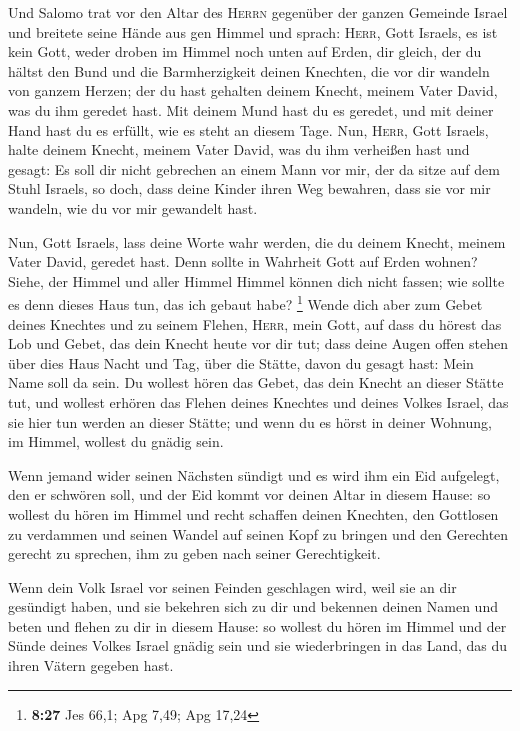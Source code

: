  Und Salomo trat vor den Altar des \textsc{Herrn}
gegenüber der ganzen Gemeinde Israel und breitete seine Hände aus gen
Himmel  und sprach: \textsc{Herr}, Gott Israels, es ist
kein Gott, weder droben im Himmel noch unten auf Erden, dir gleich, der
du hältst den Bund und die Barmherzigkeit deinen Knechten, die vor dir
wandeln von ganzem Herzen;  der du hast gehalten deinem
Knecht, meinem Vater David, was du ihm geredet hast. Mit deinem Mund
hast du es geredet, und mit deiner Hand hast du es erfüllt, wie es steht
an diesem Tage.  Nun, \textsc{Herr}, Gott Israels, halte
deinem Knecht, meinem Vater David, was du ihm verheißen hast und gesagt:
Es soll dir nicht gebrechen an einem Mann vor mir, der da sitze auf dem
Stuhl Israels, so doch, dass deine Kinder ihren Weg bewahren, dass sie
vor mir wandeln, wie du vor mir gewandelt hast.

 Nun, Gott Israels, lass deine Worte wahr werden, die du
deinem Knecht, meinem Vater David, geredet hast.  Denn
sollte in Wahrheit Gott auf Erden wohnen? Siehe, der Himmel und aller
Himmel Himmel können dich nicht fassen; wie sollte es denn dieses Haus
tun, das ich gebaut habe? \footnote{\textbf{8:27} Jes 66,1; Apg 7,49;
  Apg 17,24}  Wende dich aber zum Gebet deines Knechtes
und zu seinem Flehen, \textsc{Herr}, mein Gott, auf dass du hörest das
Lob und Gebet, das dein Knecht heute vor dir tut;  dass
deine Augen offen stehen über dies Haus Nacht und Tag, über die Stätte,
davon du gesagt hast: Mein Name soll da sein. Du wollest hören das
Gebet, das dein Knecht an dieser Stätte tut,  und wollest
erhören das Flehen deines Knechtes und deines Volkes Israel, das sie
hier tun werden an dieser Stätte; und wenn du es hörst in deiner
Wohnung, im Himmel, wollest du gnädig sein.

 Wenn jemand wider seinen Nächsten sündigt und es wird
ihm ein Eid aufgelegt, den er schwören soll, und der Eid kommt vor
deinen Altar in diesem Hause:  so wollest du hören im
Himmel und recht schaffen deinen Knechten, den Gottlosen zu verdammen
und seinen Wandel auf seinen Kopf zu bringen und den Gerechten gerecht
zu sprechen, ihm zu geben nach seiner Gerechtigkeit.

 Wenn dein Volk Israel vor seinen Feinden geschlagen
wird, weil sie an dir gesündigt haben, und sie bekehren sich zu dir und
bekennen deinen Namen und beten und flehen zu dir in diesem Hause:
 so wollest du hören im Himmel und der Sünde deines
Volkes Israel gnädig sein und sie wiederbringen in das Land, das du
ihren Vätern gegeben hast.

